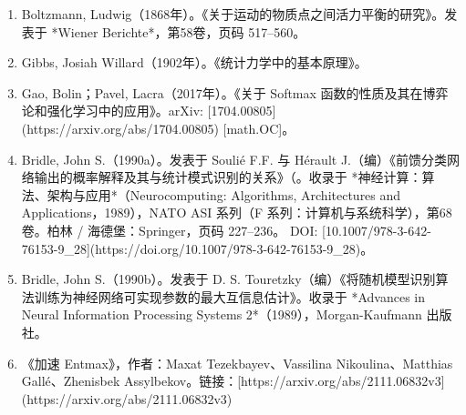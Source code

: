 \begin{enumerate}
\item Boltzmann, Ludwig（1868年）。《关于运动的物质点之间活力平衡的研究》。发表于 *Wiener Berichte*，第58卷，页码 517–560。
\item Gibbs, Josiah Willard（1902年）。《统计力学中的基本原理》。
\item Gao, Bolin；Pavel, Lacra（2017年）。《关于 Softmax 函数的性质及其在博弈论和强化学习中的应用》。arXiv: [1704.00805](https://arxiv.org/abs/1704.00805) [math.OC]。
\item Bridle, John S.（1990a）。发表于 Soulié F.F. 与 Hérault J.（编）《前馈分类网络输出的概率解释及其与统计模式识别的关系》（。收录于 *神经计算：算法、架构与应用*（Neurocomputing: Algorithms, Architectures and Applications，1989），NATO ASI 系列（F 系列：计算机与系统科学），第68卷。柏林 / 海德堡：Springer，页码 227–236。
  DOI: [10.1007/978-3-642-76153-9\_28](https://doi.org/10.1007/978-3-642-76153-9_28)。
\item Bridle, John S.（1990b）。发表于 D. S. Touretzky（编）《将随机模型识别算法训练为神经网络可实现参数的最大互信息估计》。收录于 *Advances in Neural Information Processing Systems 2*（1989），Morgan-Kaufmann 出版社。
\item 《加速 Entmax》，作者：Maxat Tezekbayev、Vassilina Nikoulina、Matthias Gallé、Zhenisbek Assylbekov。链接：[https://arxiv.org/abs/2111.06832v3](https://arxiv.org/abs/2111.06832v3)
\end{enumerate}
